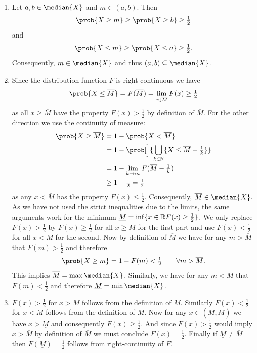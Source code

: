 \begin{solution}
\begin{enumerate}[wide=0pt]
    \item[\ref{it: (median) interval}]
    Let \(a,b \in \median{X}\) and \(m \in (a,b)\). Then
    \[
        \prob{X \ge m} \ge \prob{X \ge b} \ge \tfrac12
    \]
    and
    \[
        \prob{X \le m} \ge \prob{X \le a} \ge \tfrac12.
    \]
    Consequently, \(m \in \median{X}\) and thus \((a,b) \subseteq \median{X}\).

    \item[\ref{it: (median) interval boundaries}]
    Since the distribution function \(F\) is right-continuous we have
    \[
        \prob{X \le \overline{M}} = F(\overline{M}) = \lim_{x \downarrow \overline{M}} F(x) \ge \tfrac12
    \]
    as all \(x \ge \overline{M}\) have the property \(F(x) > \tfrac12\) by
    definition of \(\overline{M}\). For the other direction we use the
    continuity of measure:
    \[\begin{aligned}
        \prob{X \ge \overline{M}}
        &= 1 - \prob{X < \overline{M}}
        \\
        &= 1- \prob[\Big]{\bigcup_{k\in \nat} \set{X \le \overline{M} - \tfrac1k}}
        \\
        &= 1 - \lim_{k\to \infty} F(\overline{M}-\tfrac1k)
        \\
        &\ge 1- \tfrac12 = \tfrac12
    \end{aligned}
    \]
    as any \(x< \overline{M}\) has the property \(F(x) \le \tfrac12\).
    Consequently, \(\overline{M} \in \median{X}\).
    As we have not used the strict inequalities due to the limits, the
    same arguments work for the minimum \(\underline{M} = \inf\{x\in
    \mathbb{R} F(x) \ge \tfrac12\}\). We only replace \(F(x) > \tfrac12\) by
    \(F(x) \ge \tfrac12\) for all \(x \ge \underline{M}\) for the first
    part and use \(F(x) < \tfrac12\) for all \(x < \underline{M}\) for
    the second. Now by definition of \(\overline{M}\) we have for any
    \(m > \overline{M}\) that \(F(m) > \tfrac12\) and therefore
    \[
        \prob{X \ge m} = 1 - F(m) < \tfrac12 \qquad \forall m > \overline{M}.
    \]
    This implies \(\overline{M} = \max \median{X}\).
    Similarly, we have for any \(m < \underline{M}\) that \(F(m) < \tfrac12\)
    and therefore \(\underline{M} = \min \median{X}\).

    \item[\ref{it: characterization of distribution function}]
    \(F(x) > \tfrac12\) for \(x>\overline{M}\) follows from the definition
    of \(\overline{M}\). Similarly \(F(x) < \tfrac12\) for \(x<\underline{M}\)
    follows from the definition of \(\underline{M}\). Now for any
    \(x \in (\underline{M}, \overline{M})\) we have \(x> \underline{M}\) and
    consequently \(F(x) \ge \tfrac12\). And since \(F(x) > \tfrac12\) would imply
    \(x > \overline{M}\) by definition of \(\overline{M}\) we must conclude
    \(F(x) = \tfrac12\). Finally if \(\underline{M} \neq \overline{M}\)
    then \(F(\underline{M}) = \tfrac12\) follows from right-continuity of \(F\).


\end{enumerate}
\end{solution}
